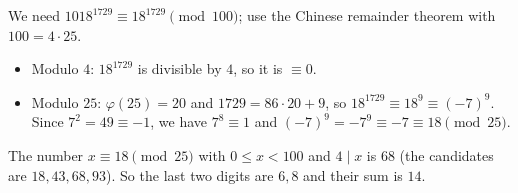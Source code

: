 We need $1018^{1729}\equiv18^{1729}\pmod{100}$; use the Chinese remainder theorem with $100=4\cdot25$.
\begin{itemize}
\item Modulo $4$: $18^{1729}$ is divisible by $4$, so it is $\equiv0$.
\item Modulo $25$: $\varphi(25)=20$ and $1729=86\cdot20+9$, so $18^{1729}\equiv18^9\equiv(-7)^9$. Since $7^2=49\equiv-1$, we have $7^8\equiv1$ and $(-7)^9=-7^9\equiv-7\equiv18\pmod{25}$.
\end{itemize}
The number $x\equiv18\pmod{25}$ with $0\le x<100$ and $4\mid x$ is $68$ (the candidates are $18,43,68,93$). So the last two digits are $6,8$ and their sum is $\boxed{14}$.
